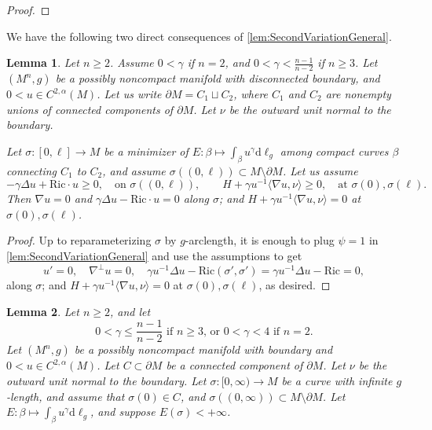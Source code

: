 \documentclass[12pt,a4paper,reqno]{amsart}
\newtheorem{lemma}{Lemma}
\theoremstyle{definition}
\renewcommand{\leq}{\leqslant}
\renewcommand{\geq}{\geqslant}
\begin{document}
{\begin{proof}
\end{proof}
We have the following two direct consequences of \cref{lem:SecondVariationGeneral}.
\begin{lemma}\label{lemgradienvanishes}
Let \(n\geq 2\). Assume \(0<\gamma\) if \(n=2\), and
\(0<\gamma<\frac{n-1}{n-2}\) if \(n\geq 3\). Let $(M^n,g)$ be a possibly noncompact manifold with disconnected boundary, and $0<u\in C^{2,\alpha}(M)$. Let us write $\partial M=C_1\sqcup C_2$, where $C_1$ and $C_2$ are nonempty unions of connected components of $\partial M$. Let $\nu$ be the outward unit normal to the boundary.

Let $\sigma:[0,\ell]\to M$ be a minimizer of $E:\beta\mapsto \int_\beta u^\gamma\mathrm{d}\ell_g$ among compact curves $\beta$ connecting $C_1$ to $C_2$, and assume $\sigma((0,\ell))\subset M\setminus \partial M$.
Let us assume
        \begin{equation}\label{eqn:ToCheckOnlyOnSpt2}
        -\gamma\Delta u+\mathrm{Ric}\cdot u \geq 0, \quad \text{on $\sigma((0,\ell))$}, \qquad H+\gamma u^{-1}\langle \nabla u,\nu\rangle\geq 0, \quad \text{at $\sigma(0),\sigma(\ell)$}.
        \end{equation}
 Then $\nabla u = 0$ and $\gamma  \Delta u- \mathrm{Ric}\cdot u=0$ along $\sigma$; and $H+\gamma u^{-1}\langle\nabla u,\nu\rangle=0$ at $\sigma(0),\sigma(\ell)$.
\end{lemma}
\begin{proof}
    Up to reparameterizing $\sigma$ by $g$-arclength, it is enough to plug $\psi=1$ in \cref{lem:SecondVariationGeneral} and use the assumptions to get
    \[
    u'=0, \quad \nabla^\perp u=0, \quad \gamma u^{-1}\Delta u - \mathrm{Ric}(\sigma',\sigma')=\gamma u^{-1}\Delta u - \mathrm{Ric}=0,
    \]
    along $\sigma$; and $H+\gamma u^{-1}\langle\nabla u,\nu\rangle=0$ at $\sigma(0),\sigma(\ell)$, as desired.
\end{proof}
\begin{lemma}\label{lemfiniteenergyfintelength}
    Let $n\geq 2$, and let 
    \begin{equation}\label{eqn:Assumptiongammainfiniteenergy}
    \text{$0<\gamma\leq \frac{n-1}{n-2}$ if $n\geq 3$, or $0<\gamma<4$ if $n=2$}.
    \end{equation}
    Let $(M^n,g)$ be a possibly noncompact manifold with boundary and $0<u\in C^{2,\alpha}(M)$. Let $C\subset\partial M$ be a connected component of $\partial M$.  Let $\nu$ be the outward unit normal to the boundary. Let $\sigma: [0, \infty) \to M$ be a curve with infinite $g$-length, and assume that $\sigma(0)\in C$, and $\sigma((0, \infty)) \subset M \setminus \partial M$.
    Let $E:\beta\mapsto \int_\beta u^\gamma\mathrm{d}\ell_g$,  
    and suppose $E(\sigma) < +\infty$.
    

\end{lemma}}
\end{document}
